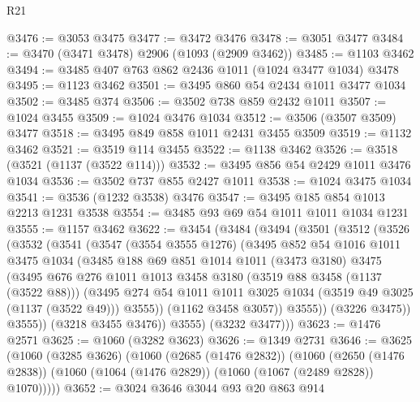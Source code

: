 \begin{lexlean}{R21}
\begin{coremodule}
@3476 := @3053 @3475
@3477 := @3472 @3476
@3478 := @3051 @3477
@3484 := @3470 (@3471 @3478) @2906 (@1093 (@2909 @3462))
@3485 := @1103 @3462
@3494 := @3485 @407 @763 @862 @2436 @1011 (@1024 @3477 @1034) @3478
@3495 := @1123 @3462
@3501 := @3495 @860 @54 @2434 @1011 @3477 @1034
@3502 := @3485 @374
@3506 := @3502 @738 @859 @2432 @1011
@3507 := @1024 @3455
@3509 := @1024 @3476 @1034
@3512 := @3506 (@3507 @3509) @3477
@3518 := @3495 @849 @858 @1011 @2431 @3455 @3509
@3519 := @1132 @3462
@3521 := @3519 @114 @3455
@3522 := @1138 @3462
@3526 := @3518 (@3521 (@1137 (@3522 @114)))
@3532 := @3495 @856 @54 @2429 @1011 @3476 @1034
@3536 := @3502 @737 @855 @2427 @1011
@3538 := @1024 @3475 @1034
@3541 := @3536 (@1232 @3538) @3476
@3547 := @3495 @185 @854 @1013 @2213 @1231 @3538
@3554 := @3485 @93 @69 @54 @1011 @1011 @1034 @1231
@3555 := @1157 @3462
@3622 := @3454
    (@3484
      (@3494
        (@3501
          (@3512
            (@3526
              (@3532
                (@3541
                  (@3547
                    (@3554 @3555 @1276)
                    (@3495
                      @852
                      @54
                      @1016
                      @1011
                      @3475
                      @1034
                      (@3485
                        @188
                        @69
                        @851
                        @1014
                        @1011
                        (@3473 @3180)
                        @3475
                        (@3495
                          @676
                          @276
                          @1011
                          @1013
                          @3458
                          @3180
                          (@3519 @88 @3458 (@1137 (@3522 @88)))
                          (@3495
                            @274
                            @54
                            @1011
                            @1011
                            @3025
                            @1034
                            (@3519 @49 @3025 (@1137 (@3522 @49)))
                            @3555))
                        (@1162 @3458 @3057))
                      @3555))
                  (@3226 @3475))
                @3555))
            (@3218 @3455 @3476))
          @3555)
        (@3232 @3477)))
@3623 := @1476 @2571
@3625 := @1060 (@3282 @3623)
@3626 := @1349 @2731
@3646 := @3625
    (@1060
      (@3285 @3626)
      (@1060
        (@2685 (@1476 @2832))
        (@1060
          (@2650 (@1476 @2838))
          (@1060 (@1064 (@1476 @2829)) (@1060 (@1067 (@2489 @2828)) @1070)))))
@3652 := @3024 @3646 @3044 @93 @20 @863 @914

\end{coremodule}
\end{lexlean}
